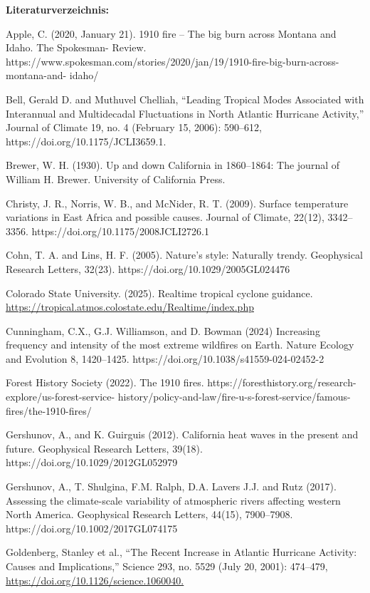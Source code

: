 \documentclass[12pt,paper=a4,DIV=12,parskip=never,chapterprefix=false,headings=standardclasses]{scrreprt}
\begin{document}
\vfill
\noindent\textbf{Literaturverzeichnis:}

\begingroup
\parindent=0pt
\everypar{\hangindent=2em\hangafter=1\relax}

Apple, C. (2020, January 21). 1910 fire – The big burn across Montana and Idaho. The Spokesman-
Review. https://www.spokesman.com/stories/2020/jan/19/1910-fire-big-burn-across-montana-and-
idaho/

Bell, Gerald D. and Muthuvel Chelliah, “Leading Tropical Modes Associated with Interannual and
Multidecadal Fluctuations in North Atlantic Hurricane Activity,” Journal of Climate 19, no. 4
(February 15, 2006): 590–612, https://doi.org/10.1175/JCLI3659.1.

Brewer, W. H. (1930). Up and down California in 1860–1864: The journal of William H. Brewer.
University of California Press.

Christy, J. R., Norris, W. B., and McNider, R. T. (2009). Surface temperature variations in East Africa
and possible causes. Journal of Climate, 22(12), 3342–3356. https://doi.org/10.1175/2008JCLI2726.1

Cohn, T. A. and Lins, H. F. (2005). Nature’s style: Naturally trendy. Geophysical Research Letters,
32(23). https://doi.org/10.1029/2005GL024476

Colorado State University. (2025). Realtime tropical cyclone guidance.
\url{https://tropical.atmos.colostate.edu/Realtime/index.php}

Cunningham, C.X., G.J. Williamson, and D. Bowman (2024) Increasing frequency and intensity of the
most extreme wildfires on Earth. Nature Ecology and Evolution 8, 1420–1425.
https://doi.org/10.1038/s41559-024-02452-2

Forest History Society (2022). The 1910 fires. https://foresthistory.org/research-explore/us-forest-service-
history/policy-and-law/fire-u-s-forest-service/famous-fires/the-1910-fires/

Gershunov, A., and K. Guirguis (2012). California heat waves in the present and future. Geophysical
Research Letters, 39(18). https://doi.org/10.1029/2012GL052979

Gershunov, A., T. Shulgina, F.M. Ralph, D.A. Lavers J.J. and Rutz (2017). Assessing the climate-scale
variability of atmospheric rivers affecting western North America. Geophysical Research Letters,
44(15), 7900–7908. https://doi.org/10.1002/2017GL074175

Goldenberg, Stanley et al., “The Recent Increase in Atlantic Hurricane Activity: Causes and
Implications,” Science 293, no. 5529 (July 20, 2001): 474–479,
\url{https://doi.org/10.1126/science.1060040.}
\end{document}
